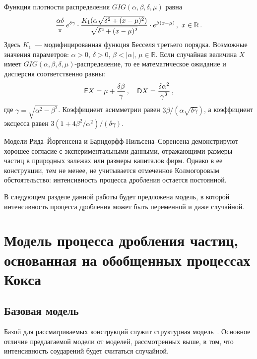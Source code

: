 \begin{multicols}{2}
Функция плотности распределения $GIG(\alpha,\beta,\delta,\mu)$
равна
$$
\displaystyle\frac{\displaystyle \alpha\delta\mathstrut}{\displaystyle \pi\mathstrut}\,e^{\delta\gamma} \cdot
\displaystyle\frac{\displaystyle K_{1}(\alpha\sqrt{\delta^{2}+(x-\mu)^{2}})\mathstrut}{\displaystyle \sqrt{\delta^{2}+(x-\mu)^{2}}\mathstrut}\cdot
e^{\beta(x-\mu)}\,,\  x\in\mathbb{R}\,.
$$
Здесь $K_{1}$~--- модифицированная функция Бесселя третьего
порядка. Возможные значения па\-ра\-мет\-ров: $\alpha>0$, $\delta>0$,
$\beta<|\alpha|$, $\mu\in\mathbb{R}$. Если случайная величина $X$
имеет $GIG(\alpha,\beta,\delta,\mu)$-распределение, то ее
математическое ожидание и дисперсия соответственно равны:
$$
{\sf E}X = \mu + \displaystyle\frac{\displaystyle \delta\beta\mathstrut}{\displaystyle \gamma\mathstrut}\,,\quad {\sf
D}X=\displaystyle\frac{\displaystyle \delta\alpha^{2}\mathstrut}{\displaystyle \gamma^{3}\mathstrut}\,,
$$
где $\gamma = \sqrt{\alpha^{2}-\beta^{2}}$. Коэффициент асимметрии
равен $3 \beta /(\alpha\sqrt{\delta\gamma})$, а коэффициент
эксцесса равен $3(1+4 \beta^{2} / \alpha^{2})/(\delta\gamma)$.

Модели Рида--Йоргенсена и Барндорфф-Ниль\-се\-на--Соренсена
демонстрируют хорошее согласие с экспериментальными данными,
отражающими размеры частиц в природных залежах или размеры
капиталов фирм. Однако в ее конструкции, тем не менее, не
учитывается отмеченное Колмогоровым обстоятельство: интенсивность
процесса дробления остается постоянной.

В следующем разделе данной работы будет предложена модель, в
которой интенсивность процесса дробления может быть переменной и
даже случайной.

\section{Модель процесса дробления частиц, основанная на обобщенных процессах Кокса}

\subsection{Базовая модель}

Базой для рассматриваемых конструкций служит структурная модель~\cite{1kk}.
Основное отличие предлагаемой модели от моделей,
рассмотренных выше, в том, что интенсивность соударений будет
считаться случайной.


\end{multicols}
